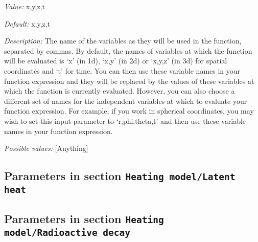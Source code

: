 \begin{itemize}
{\it Value:} x,y,z,t


{\it Default:} x,y,z,t


{\it Description:} The name of the variables as they will be used in the function, separated by commas. By default, the names of variables at which the function will be evaluated is `x' (in 1d), `x,y' (in 2d) or `x,y,z' (in 3d) for spatial coordinates and `t' for time. You can then use these variable names in your function expression and they will be replaced by the values of these variables at which the function is currently evaluated. However, you can also choose a different set of names for the independent variables at which to evaluate your function expression. For example, if you work in spherical coordinates, you may wish to set this input parameter to `r,phi,theta,t' and then use these variable names in your function expression.


{\it Possible values:} [Anything]
\end{itemize}

\subsection{Parameters in section \tt Heating model/Latent heat}
\label{parameters:Heating_20model/Latent_20heat}


\subsection{Parameters in section \tt Heating model/Radioactive decay}
\label{parameters:Heating_20model/Radioactive_20decay}

